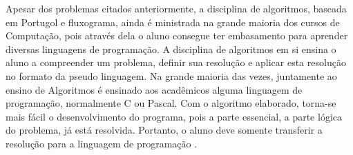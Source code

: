 Apesar dos problemas citados anteriormente, a disciplina de algoritmos, baseada
em Portugol e fluxograma, ainda é ministrada na grande maioria dos cursos de
Computação, pois através dela o aluno consegue ter embasamento para aprender
diversas linguagens de programação. A disciplina de algoritmos em si ensina o
aluno a compreender um problema, definir sua resolução e aplicar esta resolução
no formato da pseudo linguagem. Na grande maioria das vezes, juntamente ao
ensino de Algoritmos é ensinado aos acadêmicos alguma linguagem de programação,
normalmente C ou Pascal. Com o algoritmo elaborado, torna-se mais fácil o
desenvolvimento do programa, pois a parte essencial, a parte lógica do problema,
já está resolvida. Portanto, o aluno deve somente transferir a resolução para a
linguagem de programação \cite{miranda2004}.

\lstset{language=Pascal}


